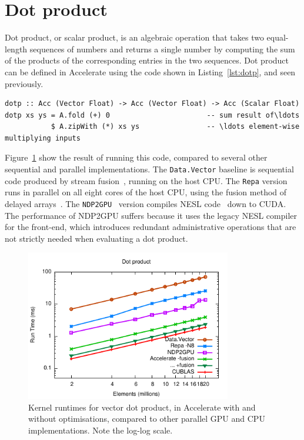 \section{Dot product}
\label{sec:dotp}

Dot product, or scalar product, is an algebraic operation that takes two
equal-length sequences of numbers and returns a single number by computing the
sum of the products of the corresponding entries in the two sequences. Dot
product can be defined in Accelerate using the code shown in
Listing~\ref{lst:dotp}, and seen previously.

\begin{lstlisting}[style=haskell_float
    ,label=lst:dotp
    ,caption={Vector dot-product}]
dotp :: Acc (Vector Float) -> Acc (Vector Float) -> Acc (Scalar Float)
dotp xs ys = A.fold (+) 0                       -- sum result of\ldots
           $ A.zipWith (*) xs ys                -- \ldots element-wise multiplying inputs
\end{lstlisting}

Figure~\ref{fig:dotp} show the result of running this code, compared to several
other sequential and parallel implementations. The \texttt{Data.Vector} baseline
is sequential code produced by stream
fusion~\cite{Coutts:2007kp}, running on the host CPU. The \texttt{Repa} version
runs in parallel on all eight cores of the host CPU, using the fusion method of
delayed arrays~\cite{Keller:2010er}. The
\texttt{NDP2GPU}~\cite{Bergstrom:2012bi} version compiles NESL
code~\cite{Blelloch:1995ut} down to CUDA. The performance of NDP2GPU suffers
because it uses the legacy NESL compiler for the front-end, which introduces
redundant administrative operations that are not strictly needed when evaluating
a dot product.

\begin{figure}
    \begin{center}
        \includegraphics[width=0.8\textwidth]{images/sec-6/dotp/dotp}
    \end{center}
    \caption[Vector dot product kernel benchmarks]{Kernel runtimes for vector
        dot product, in Accelerate with and without optimisations, compared to
        other parallel GPU and CPU implementations. Note the log-log scale.}
    \label{fig:dotp}
\end{figure}

